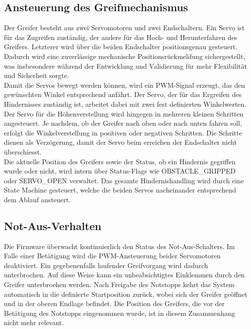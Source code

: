 \documentclass[main.tex]{subfiles} %
\begin{document}
\subsection{Ansteuerung des Greifmechanismus}
Der Greifer besteht aus zwei Servomotoren und zwei Endschaltern. Ein Servo ist für das Zugreifen zuständig,
der andere für das Hoch- und Herunterfahren des Greifers. Letzterer wird über die beiden Endschalter
positionsgenau gesteuert. Dadurch wird eine zuverlässige mechanische Positionsrückmeldung sichergestellt,
was insbesondere während der Entwicklung und Validierung für mehr Flexibilität und Sicherheit sorgte.\\
Damit die Servos bewegt werden können, wird ein PWM-Signal erzeugt, das den
gewünschten Winkel entsprechend anfährt. Der Servo, der für das Ergreifen des Hindernisses zuständig ist,
arbeitet dabei mit zwei fest definierten Winkelwerten. Der Servo für die Höhenverstellung wird hingegen in
mehreren kleinen Schritten angesteuert. Je nachdem, ob der Greifer nach oben oder nach unten fahren soll,
erfolgt die Winkelverstellung in positiven oder negativen Schritten. Die Schritte dienen als Verzögerung,
damit der Servo beim erreichen der Endschalter nicht überschiesst.\\
Die aktuelle Position des Greifers sowie der Status, ob ein Hindernis gegriffen wurde oder nicht, wird intern
über Status-Flags wie OBSTACLE\_GRIPPED oder SERVO\_OPEN verwaltet. Das gesamte Hindernishandling wird durch
eine State Machine gesteuert, welche die beiden Servos nacheinander entsprechend dem Ablauf ansteuert.

\subsection{Not-Aus-Verhalten}
Die Firmware überwacht kontinuierlich den Status des Not-Aus-Schalters. Im Falle einer Betätigung
wird die PWM-Ansteuerung beider Servomotoren deaktiviert. Ein gegebenenfalls laufender Greifvorgang wird dadurch unterbrochen.
Auf diese Weise kann ein unbeabsichtigtes Einklemmen durch den Greifer unterbrochen werden. Nach Freigabe des Notstopps kehrt das System automatisch
in die definierte Startposition zurück, wobei sich der Greifer geöffnet und in der oberen Endlage befindet. Die Position des Greifers, die
vor der Betätigung des Notstopps eingenommen wurde, ist in diesem Zusammenhang nicht mehr relevant.
\end{document}
